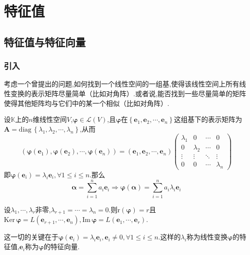 \newpage
\chapter{特征值}
\section{特征值与特征向量}
\subsection{引入}
\begin{red}
\begin{remark}
    考虑一个曾提出的问题,如何找到一个线性空间的一组基,使得该线性空间上所有线性变换的表示矩阵尽量简单（比如对角阵）.或者说,能否找到一些尽量简单的矩阵使得其他矩阵均与它们中的某一个相似（比如对角阵）.
\end{remark}
\end{red}
设$\mathbb{K}$上的$n$维线性空间$V$,$\bm{\varphi}\in\mathcal{L}\left(V\right)$,且$\bm{\varphi}$在$\left\{
    \bm{e}_1,\bm{e}_2,\cdots,\bm{e}_n
\right\}$这组基下的表示矩阵为$\bm{A}=\mathrm{diag}\,\left\{
    \lambda_1,\lambda_2,\cdots,\lambda_n
\right\}$,从而
\[
\left(
       \bm{\varphi}\left(\bm{e}_1\right),\bm{\varphi}\left(\bm{e}_2\right),\cdots,\bm{\varphi}\left(\bm{e}_n\right)   
\right)=
\left(
    \bm{e}_1,\bm{e}_2,\cdots,\bm{e}_n
\right)\begin{pmatrix}
    \lambda_1&0&\cdots&0\\
    0&\lambda_2&\cdots&0\\
    \vdots&\vdots&\ddots&\vdots\\
    0&0&\cdots&\lambda_n
\end{pmatrix}
\]即$\bm{\varphi}\left(
    \bm{e}_i
\right)=\lambda_i\bm{e}_i,\forall 1\leqslant i\leqslant n.$那么
\[
\bm{\alpha}= \sum_{i=1}^{n} a_i\bm{e}_i\Longrightarrow
\bm{\varphi}\left(
    \bm{\alpha}
\right)=\sum_{i=1}^{n}a_i\lambda_i
    \bm{e}_i
\]

设$\lambda_1,\cdots,\lambda_r$非零,$
\lambda_{r+1}=\cdots=\lambda_n=0.$则$\mathrm{r}\left(
    \bm{\varphi}
\right)=r$且$\mathrm{Ker}\,\bm{\varphi}=L\left(
     \bm{e}_{r+1},\cdots,\bm{e}_n
\right),\mathrm{Im}\,\bm{\varphi}=L\left(
    \bm{e}_1,\cdots,\bm{e}_r
\right)$.

这一切的关键在于$
\bm{\varphi}\left(
    \bm{e}_i
\right)=\lambda_i\bm{e}_i,\bm{e}_i\neq 0,\forall 1\leqslant i\leqslant n
$.这样的$\lambda_i$称为线性变换$\bm{\varphi}$的特征值,$\bm{e}_i$称为$\bm{\varphi}$的特征向量.
